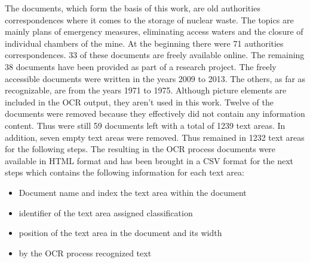 The documents, which form the basis of this work, are old authorities correspondences where it comes to the storage of nuclear waste. The topics are mainly plans of emergency measures, eliminating access waters and the closure of individual chambers of the mine. At the beginning there were 71 authorities correspondences. 33 of these documents are freely available online. The remaining 38 documents have been provided as part of a research project. The freely accessible documents were written in the years 2009 to 2013. The others, as far as recognizable, are from the years 1971 to 1975. Although picture elements are included in the OCR output, they aren't used in this work. Twelve of the documents were removed because they effectively did not contain any information content. Thus were still 59 documents left with a total of 1239 text areas. In addition, seven empty text areas were removed. Thus remained in 1232 text areas for the following steps. The resulting in the OCR process documents were available in HTML format and has been brought in a CSV format for the next steps which contains the following information for each text area:



\begin{itemize}
\setlength{\itemsep}{-5pt}
 \item Document name and index the text area within the document
 \item identifier of the text area assigned classification
 \item position of the text area in the document and its width
 \item by the OCR process recognized text
\end{itemize}

